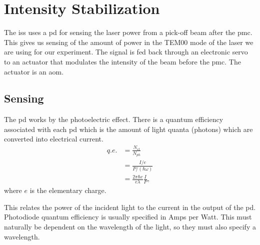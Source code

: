 
\section{Intensity Stabilization}


The \ac{iss} uses a \ac{pd} for sensing the laser power from a pick-off
beam after the \ac{pmc}. This gives us sensing of the amount of power in
the TEM00 mode of the laser we are using for our experiment. The signal is
fed back through an electronic servo to an actuator that modulates the
intensity of the beam before the \ac{pmc}. The actuator is an \ac{aom}.

\subsection{Sensing}

The \ac{pd} works by the photoelectric effect. There is a quantum
efficiency associated with each \ac{pd} which is the amount of light quanta
(photons) which are converted into electrical current.
\begin{align}
q.e. &= \frac{N_{el}}{N_{ph}} \\
     &= \frac{I/e}{P/(\hbar \omega)} \\
     &= \frac{2 \pi \hbar c}{e \lambda} \frac{I}{P} ,
\end{align}
where $e$ is the elementary charge.

This relates the
power of the incident light to the current in the output of the \ac{pd}.
Photodiode quantum efficiency is usually specified in Amps per Watt.
This must naturally be dependent on the wavelength of the light, so they must
also specify a wavelength.

